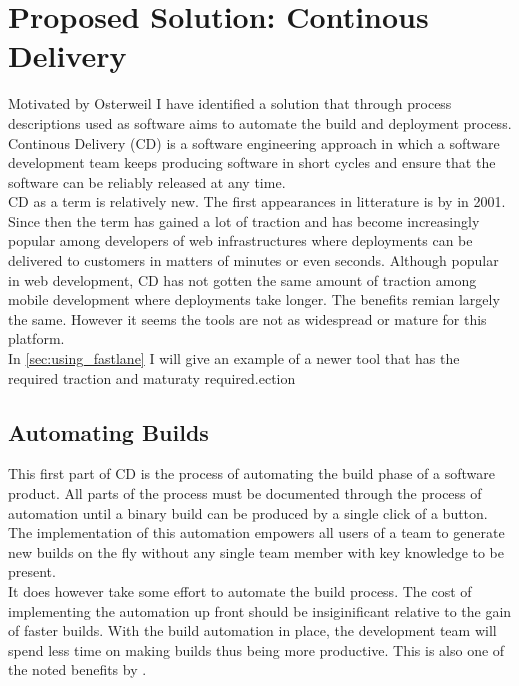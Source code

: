 \documentclass{ituthesis}
\begin{document}
\chapter{Proposed Solution: Continous Delivery}
\label{ch:proposed_solution}

Motivated by Osterweil \cite{Osterweil1997} I have identified a solution that through process descriptions used as software aims to automate the build and deployment process.\\

Continous Delivery (CD) is a software engineering approach in which a software development team keeps producing software in short cycles and ensure that the software can be reliably released at any time. \cite{Chen2015}\\

CD as a term is relatively new. The first appearances in litterature is by \cite{beck2001agile} in 2001. Since then the term has gained a lot of traction and has become increasingly popular among developers of web infrastructures where deployments can be delivered to customers in matters of minutes or even seconds. Although popular in web development, CD has not gotten the same amount of traction among mobile development where deployments take longer. The benefits remian largely the same. However it seems the tools are not as widespread or mature for this platform.\\

In \autoref{sec:using_fastlane} I will give an example of a newer tool that has the required traction and maturaty required.ection

\section{Automating Builds}

This first part of CD is the process of automating the build phase of a software product. All parts of the process must be documented through the process of automation \cite{Osterweil1997} until a binary build can be produced by a single click of a button. The implementation of this automation empowers all users of a team to generate new builds on the fly without any single team member with key knowledge to be present.\\

It does however take some effort to automate the build process. The cost of implementing the automation up front should be insiginificant relative to the gain of faster builds. With the build automation in place, the development team will spend less time on making builds thus being more productive. This is also one of the noted benefits by \cite{Chen2015}.
\end{document}
